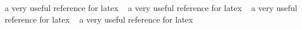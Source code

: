 \documentclass[12pt]{article}
\renewcommand{\_}{\kern-1.5pt\textunderscore\kern-1.5pt}
\begin{document}






a very useful reference for latex ~\cite{cointelegraph_2018}
a very useful reference for latex ~\cite{blockchain_pulse_ibm_blockchain_blog_2020}
a very useful reference for latex ~\cite{coin_center}
a very useful reference for latex ~\cite{hurley_feed}



{}

\end{document}

